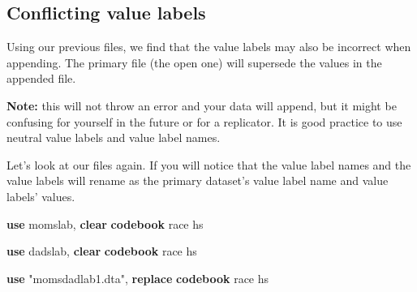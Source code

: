 \documentclass[
]{book}
\newenvironment{Shaded}{\begin{snugshade}}{\end{snugshade}}
\newcommand{\KeywordTok}[1]{\textcolor[rgb]{0.13,0.29,0.53}{\textbf{#1}}}
\newcommand{\NormalTok}[1]{#1}
\newcommand{\StringTok}[1]{\textcolor[rgb]{0.31,0.60,0.02}{#1}}
\begin{document}
\subsection{Conflicting value labels}\label{conflicting-value-labels}

Using our previous files, we find that the value labels may also be incorrect when appending. The primary file (the open one) will supersede the values in the appended file.

\textbf{Note:} this will not throw an error and your data will append, but it might be confusing for yourself in the future or for a replicator. It is good practice to use neutral value labels and value label names.

Let's look at our files again.
If you will notice that the value label names and the value labels will rename as the primary dataset's value label name and value labels' values.

\begin{Shaded}
\begin{Highlighting}[]
\KeywordTok{use}\NormalTok{ momslab, }\KeywordTok{clear}
\KeywordTok{codebook}\NormalTok{ race hs}

\KeywordTok{use}\NormalTok{ dadslab, }\KeywordTok{clear}
\KeywordTok{codebook}\NormalTok{ race hs}

\KeywordTok{use} \StringTok{"momsdadlab1.dta"}\NormalTok{, }\KeywordTok{replace}
\KeywordTok{codebook}\NormalTok{ race hs}
\end{Highlighting}
\end{Shaded}
\end{document}
